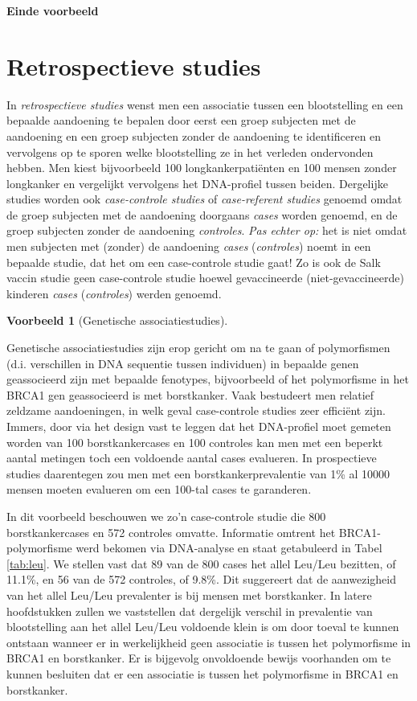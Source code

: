 \documentclass[
  12pt,dutch]{book}
\theoremstyle{definition}
\theoremstyle{definition}
\newtheorem{example}{Voorbeeld}[chapter]
\theoremstyle{definition}
\theoremstyle{definition}
\theoremstyle{remark}
\begin{document}
\textbf{Einde voorbeeld}

\section{Retrospectieve studies}\label{subsec:design:retro}

In \emph{retrospectieve studies} wenst men een associatie tussen een
blootstelling en een bepaalde aandoening te bepalen door eerst een groep
subjecten met de aandoening en een groep subjecten zonder de aandoening te
identificeren en vervolgens op te sporen welke blootstelling ze in het
verleden ondervonden hebben. Men kiest bijvoorbeeld 100
longkankerpatiënten en 100 mensen zonder longkanker en vergelijkt vervolgens het DNA-profiel tussen beiden. Dergelijke studies worden
ook \emph{case-controle studies} of \emph{case-referent studies} genoemd
omdat de groep subjecten met de aandoening doorgaans \emph{cases} worden genoemd,
en de groep subjecten zonder de aandoening \emph{controles}. \emph{Pas echter op:} het is niet omdat men subjecten met (zonder) de aandoening \emph{cases}
(\emph{controles}) noemt in een bepaalde studie, dat het om een case-controle
studie gaat! Zo is ook de Salk vaccin studie geen case-controle studie
hoewel gevaccineerde (niet-gevaccineerde) kinderen \emph{cases} (\emph{controles})
werden genoemd.

\begin{example}[Genetische associatiestudies]
\protect\hypertarget{exm:brcaLeu}{}\label{exm:brcaLeu}~
\end{example}

Genetische associatiestudies zijn erop gericht om na te gaan of polymorfismen (d.i. verschillen in DNA sequentie tussen individuen) in bepaalde genen geassocieerd zijn met bepaalde fenotypes, bijvoorbeeld of het polymorfisme in het BRCA1 gen geassocieerd is met borstkanker. Vaak bestudeert men relatief zeldzame aandoeningen, in welk geval case-controle studies zeer efficiënt zijn. Immers, door via het design vast te leggen dat het DNA-profiel moet gemeten worden van 100 borstkankercases en 100 controles kan men met een beperkt aantal metingen toch een voldoende aantal cases evalueren. In prospectieve studies daarentegen zou men met een borstkankerprevalentie van 1\% al 10000 mensen moeten evalueren om een 100-tal cases te garanderen.

In dit voorbeeld beschouwen we zo'n case-controle studie die 800 borstkankercases en 572 controles omvatte. Informatie omtrent het BRCA1-polymorfisme werd bekomen via DNA-analyse en staat getabuleerd in Tabel \ref{tab:leu}.
We stellen vast dat 89 van de 800 cases het allel Leu/Leu bezitten, of 11.1\%, en 56 van de 572 controles, of 9.8\%. Dit suggereert dat de aanwezigheid van het allel Leu/Leu prevalenter is bij mensen met borstkanker. In latere hoofdstukken zullen
we vaststellen dat dergelijk verschil in prevalentie van blootstelling aan
het allel Leu/Leu voldoende klein is om door toeval te kunnen ontstaan wanneer er in
werkelijkheid geen associatie is tussen het polymorfisme in BRCA1 en borstkanker. Er is bijgevolg onvoldoende bewijs voorhanden om te kunnen besluiten dat er een associatie is tussen het polymorfisme in BRCA1 en borstkanker.
\end{document}
